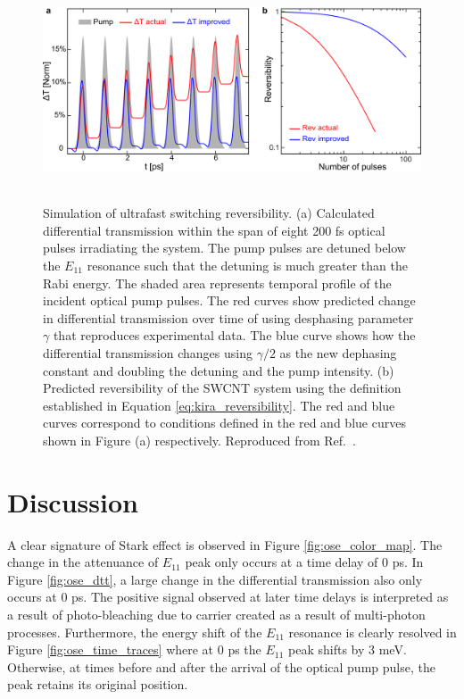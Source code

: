 \begin{figure}[ht]
	\centering
	\includegraphics[height=2.6in]{images/chapter_coherent/switching_reversibility}
	\caption{ Simulation of ultrafast switching reversibility. (a) Calculated differential transmission within the span of eight 200 fs optical pulses irradiating the system. The pump pulses are detuned below the $E_{11}$ resonance such that the detuning is much greater than the Rabi energy. The shaded area represents temporal profile of the incident optical pump pulses. The red curves show predicted change in differential transmission over time of using desphasing parameter $\gamma$ that reproduces experimental data. The blue curve shows how the differential transmission changes using $\gamma/2$ as the new dephasing constant and doubling the detuning and the pump intensity. (b) Predicted reversibility of the SWCNT system using the definition established in Equation \eqref{eq:kira_reversibility}. The red and blue curves correspond to conditions defined in the red and blue curves shown in Figure (a) respectively.  Reproduced from Ref.\ \cite{mack2019}.}
  \label{fig:ose_kira_simul}
\end{figure}



\clearpage

\section{Discussion}

A clear signature of Stark effect is observed in Figure \ref{fig:ose_color_map}. The change in the attenuance of $E_{11}$ peak only occurs at a time delay of 0 ps. In Figure \ref{fig:ose_dtt}, a large change in the differential transmission also only occurs at 0 ps. The positive signal observed at later time delays is interpreted as a result of photo-bleaching due to carrier created as a result of multi-photon processes. Furthermore, the energy shift of the $E_{11}$ resonance is clearly resolved in Figure \ref{fig:ose_time_traces} where at 0 ps the $E_{11}$ peak shifts by 3 meV. Otherwise, at times before and after the arrival of the optical pump pulse, the peak retains its original position.

